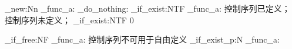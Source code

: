 \documentclass{article}
\begin{document}
\ExplSyntaxOn
\cs_new:Nn \my_func_a: { \prg_do_nothing: }
\cs_if_exist:NTF \my_func_a: 
  { 控制序列已定义； }
  { 控制序列未定义； }
\cs_if_exist:NTF  { 0 } \par
\cs_if_free:NF \my_func_a: 
  { 控制序列不可用于自由定义 }
\cs_if_exist_p:N \my_func_a: 
\ExplSyntaxOff
\end{document}
